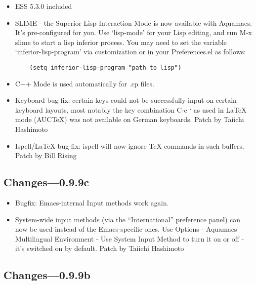 \begin{itemize}
\item  ESS 5.3.0 included

\item  SLIME - the Superior Lisp Interaction Mode is now available with
	Aquamacs. It's pre-configured for you. Use `lisp-mode' for your
	Lisp editing, and run M-x slime to start a lisp inferior
	process. You may need to set the variable `inferior-lisp-program'
	via customization or in your Preferences.el as follows:

\begin{verbatim}
	(setq inferior-lisp-program "path to lisp")
\end{verbatim}


\item  C++ Mode is used automatically for .cp files.
	
\item  Keyboard bug-fix: certain keys could not be successfully input
	on certain keyboard layouts, most notably the key combination 
	C-c ` as used in LaTeX mode (AUCTeX) was not available on German
	keyboards.
	Patch by Taiichi Hashimoto

\item  Ispell/LaTeX bug-fix: ispell will now ignore TeX commands in
	such buffers.
	Patch by Bill Rising
	

\end{itemize}	

\subsection{Changes---0.9.9c}

\begin{itemize}

\item Bugfix: Emacs-internal Input methods work again. 

\item System-wide input methods (via the ``International'' preference
	panel) can now be used instead of the Emacs-specific ones.  Use
	Options - Aquamacs Multilingual Environment - Use System Input Method
	to turn it on or off - it's switched on by default.
	Patch by Taiichi Hashimoto
\end{itemize}	
 
\subsection{Changes---0.9.9b}

